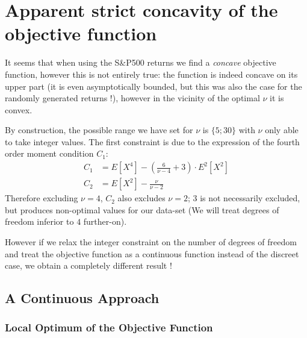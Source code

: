 \chapter{Apparent strict concavity of the objective function}



It seems that when using the S\&P500 returns we find a \emph{concave} objective function, however this is not entirely true: the function is indeed concave on its upper part (it is even asymptotically bounded, but this was also the case for the randomly generated returns !), however in the vicinity of the optimal $\nu$ it is convex. \smallskip
\par
By construction, the possible range we have set for $\nu$ is $\{5;30\}$ with $\nu$ only able to take integer values. The first constraint is due to the expression of the fourth order moment condition $C_1$:
\begin{align*}
    C_1 &= E\left[X^4\right] - \left(\frac{6}{\nu-4}+3\right)\cdot E^2\left[X^2\right] \\
    C_2 &= E\left[X^2\right] - \frac{\nu}{\nu - 2}
\end{align*}
Therefore excluding $\nu = 4$, $C_2$ also excludes $\nu=2$; $3$ is not necessarily excluded, but produces non-optimal values for our data-set (We will treat degrees of freedom inferior to $4$ further-on).
\par
However if we relax the integer constraint on the number of degrees of freedom and treat the objective function as a continuous function instead of the discreet case, we obtain a completely different result !


\section{A Continuous Approach}

\subsection{Local Optimum of the Objective Function}

